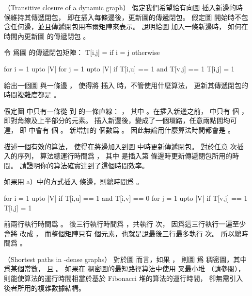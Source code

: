 \startsubject[
  title={Problems},
]

\startPROBLEM
（Transitive closure of a dynamic graph）
假定我們希望給有向圖  插入新邊的時候維持其傳遞閉包，
即在插入每條邊後，更新圖的傳遞閉包。
假定圖  開始時不包含任何邊，並且傳遞閉包用布爾矩陣來表示。
\startigBase[a]\startitem
說明給圖  加入一條新邊時，
如何在  時間內更新圖  的傳遞閉包 。
\stopitem\stopigBase

\startANSWER
令  爲圖  的傳遞閉包矩陣：
\startformula
T[i,j] = \startcases
{} \MC if i = j \NR
{} \MC otherwise \NR
\stopcases
\stopformula

\startCLRS
for i = 1 upto |V|
	for j = 1 upto |V|
		if T[i,u] == 1 and T[v,j] == 1
			T[i,j] = 1
\stopCLRS

\stopANSWER

\startigBase[continue]\startitem
給出一個圖  與一條邊 ，
使得將  插入  時，不管使用什麼算法，
更新其傳遞閉包的時間複雜度都是 。
\stopitem\stopigBase

\startANSWER
假定圖  中只有一條從  到  的一條直線：
 ，
其中 。在插入新邊之前，  中只有  個 ，
即對角線及上半部分的元素。
插入新邊後，變成了一個環路，任意兩點間均可達，
即  中會有  個 。
新增加的  個數爲 。
因此無論用什麼算法時間都會是 。
\stopANSWER

\startigBase[continue]\startitem
描述一個有效的算法，
使得在將邊加入到圖  中時更新傳遞閉包。
對於任意  次插入的序列，
算法總運行時間爲 ，
其中  是插入第  條邊時更新傳遞閉包所用的時間。
請證明你的算法確實達到了這個時間效率。
\stopitem\stopigBase

\startANSWER
如果用 a）中的方式插入  條邊，則總時間爲 。

\startCLRS
for i = 1 upto |V|
	if T[i,u] == 1 and T[i,v] == 0
		for j = 1 upto |V|
			if T[v,j] == 1
				T[i,j] = 1
\stopCLRS

前兩行執行時間爲 。
後三行執行時間爲 ，共執行  次，
因爲這三行執行一遍至少會將  改成 ，
而整個矩陣只有  個元素，也就是說最後三行最多執行  次。
所以總時間爲 。
\stopANSWER

\startPROBLEM
（Shortest paths in \m{\epsilon}-dense graphs）
對於圖  而言，如果 ，
則圖  爲{\EMP \m{\epsilon} 稠密圖}，其中 \m{\epsilon} 爲某個常數，
且 。
如果在 \m{\epsilon} 稠密圖的最短路徑算法中使用  叉最小堆
（請參閱），
則能使算法的運行時間相當於基於 Fibonacci 堆的算法的運行時間，
卻無需引入後者所用的複雜數據結構。

